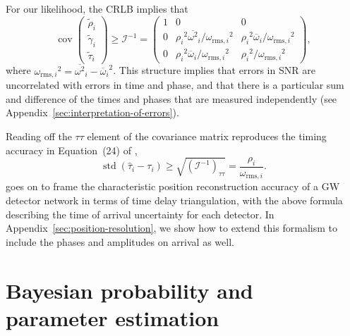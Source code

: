 \documentclass[amsmath,amssymb,aps,prx,reprint,nopreprintnumbers,nofootinbib,showpacs]{revtex4-1}
\DeclareMathOperator{\cov}{cov}
\DeclareMathOperator{\std}{std}
\begin{document}
For our likelihood, the \ac{CRLB} implies that
%
\begin{equation}\label{eq:covariance-matrix}
    \cov{
        \left(
        \begin{array}{c}
            \tilde{\rho}_i \\
            \tilde{\gamma}_i \\
            \tilde{\tau}_i
        \end{array}
        \right)
    } \geq \mathcal{I}^{-1} = \left(
        \begin{array}{ccc}
            1 & 0 & 0 \\
            0 & {\rho_i}^2 {\overline{\omega^2}}_i/{\omega_{\mathrm{rms},i}}^2 & {\rho_i}^2 {\overline{\omega}}_i/{\omega_{\mathrm{rms},i}}^2 \\
            0 & {\rho_i}^2 {\overline{\omega}}_i/{\omega_{\mathrm{rms},i}}^2 & {\rho_i}^2/{\omega_{\mathrm{rms},i}}^2
        \end{array}
    \right),
\end{equation}
%
where ${\omega_{\mathrm{rms},i}}^2 = {\overline{\omega^2}}_i - {{\overline{\omega}}_i}^2$. This structure implies that errors in \ac{SNR} are uncorrelated with errors in time and phase, and that there is a particular sum and difference of the times and phases that are measured independently (see Appendix~\ref{sec:interpretation-of-errors}).

Reading off the $\tau \tau$ element of the covariance matrix reproduces the timing accuracy in Equation~(24) of \cite{FairhurstTriangulation},
%
\begin{equation}\label{eq:timing-crlb}
    \std \left(\hat{\tau}_i - \tau_i \right) \geq \sqrt{\left(\mathcal{I}^{-1}\right)_{\tau\tau}} = \frac{\rho_i}{\omega_{\mathrm{rms},i}}.
\end{equation}
%
\citet{FairhurstTriangulation} goes on to frame the characteristic position reconstruction accuracy of a \ac{GW} detector network in terms of time delay triangulation, with the above formula describing the time of arrival uncertainty for each detector. In Appendix~\ref{sec:position-resolution}, we show how to extend this formalism to include the phases and amplitudes on arrival as well.

\section{Bayesian probability and parameter estimation}
\label{sec:parameter-estimation}
\end{document}
